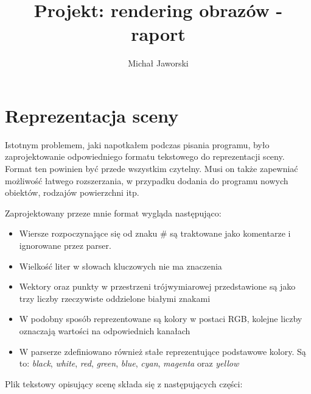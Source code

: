 \documentclass[11pt,a4paper]{article}
\title{\vspace{-2.0cm}\textbf{Projekt: rendering obrazów - raport}}
\author{Michał Jaworski}
\begin{document}
\maketitle
\section{Reprezentacja sceny}
Istotnym problemem, jaki napotkałem podczas pisania programu, było zaprojektowanie odpowiedniego formatu tekstowego do reprezentacji sceny. Format ten powinien być przede wszystkim czytelny. Musi on także zapewniać możliwość łatwego rozszerzania, w przypadku dodania do programu nowych obiektów, rodzajów powierzchni itp.

Zaprojektowany przeze mnie format wygląda następująco:
\begin{itemize}
\item Wiersze rozpoczynające się od znaku \# są traktowane jako komentarze i ignorowane przez parser.
\item Wielkość liter w słowach kluczowych nie ma znaczenia
\item Wektory oraz punkty w przestrzeni trójwymiarowej przedstawione są jako trzy liczby rzeczywiste oddzielone białymi znakami
\item W podobny sposób reprezentowane są kolory w postaci RGB, kolejne liczby oznaczają wartości na odpowiednich kanałach
\item W parserze zdefiniowano również stałe reprezentujące podstawowe kolory. Są to: \textit{black}, \textit{white}, \textit{red}, \textit{green}, \textit{blue}, \textit{cyan}, \textit{magenta} oraz \textit{yellow}
\end{itemize}
Plik tekstowy opisujący scenę składa się z następujących części:
\end{document}

